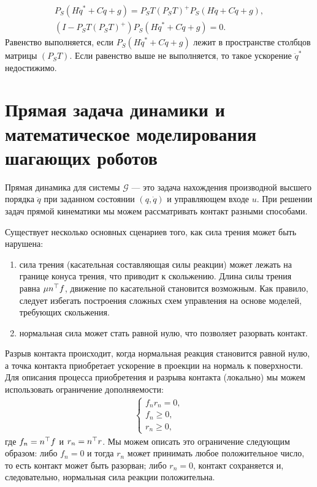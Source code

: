 %
\begin{align}
	{P}_S({H}\ddot{{q}}^* + {C}\dot{{q}}+ {g}) = {P}_S{T}({P}_S{T})^+{P}_S({H}\ddot{{q}} + {C}\dot{{q}}+ {g}),
	\\
	({I}-{P}_S{T}({P}_S{T})^+){P}_S({H}\ddot{{q}}^* + {C}\dot{{q}}+ {g}) = 0.
\end{align}
%
%
Равенство выполняется, если ${P}_S({H}\ddot{{q}}^* + {C}\dot{{q}}+ {g})$ лежит в пространстве столбцов матрицы $({P}_S{T})$.
Если равенство выше не выполняется, то такое ускорение $\ddot{{q}}^*$ недостижимо.

\section{Прямая задача динамики и математическое моделирования шагающих роботов}\label{sec:ch2/sect5}
Прямая динамика для системы $\mathcal{G}$ --- это задача нахождения производной высшего порядка $\ddot{{q}}$ при заданном состоянии $({q}, \dot{{q}})$ и управляющем входе ${u}$. При решении задач прямой кинематики мы можем рассматривать контакт разными способами.

Существует несколько основных сценариев того, как сила трения может быть нарушена:
%
\begin{enumerate}
	\item сила трения (касательная составляющая силы реакции) может лежать на границе конуса трения, что приводит к скольжению. Длина силы трения равна $\mu {n}^\top {f}$, движение по касательной становится возможным. Как правило, следует избегать построения сложных схем управления на основе моделей, требующих скольжения.
	\item нормальная сила может стать равной нулю, что позволяет разорвать контакт.
\end{enumerate}

Разрыв контакта происходит, когда нормальная реакция становится равной нулю, а точка контакта приобретает ускорение в проекции на нормаль к поверхности.
%
Для описания процесса приобретения и разрыва контакта (локально) мы можем использовать ограничение дополняемости:
%
\begin{align}
	\label{eq:part2_cond}
	\begin{cases}
		f_n r_n = 0, \\
		f_n \geq 0, \\
		r_n \geq 0,
	\end{cases}
\end{align}
где $f_n = {n}^\top{f}$ и $r_n ={n}^\top{r}$. Мы можем описать это ограничение следующим образом: либо $f_n = 0$ и тогда $r_n$ может принимать любое положительное число, то есть контакт может быть разорван; либо $r_n = 0$, контакт сохраняется и, следовательно, нормальная сила реакции положительна.

